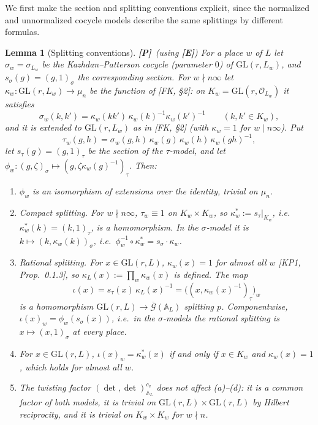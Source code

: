 \documentclass[12pt]{article}
\newcommand{\ov}[1]{\overline{#1}}
\newcommand{\A}{\mathbb{A}}
\newcommand{\cO}{\mathcal{O}}
\newcommand{\GL}{\mathrm{GL}}
\newcommand{\ks}{\kappa^{*}}
\newcommand{\cGb}{\ov{\mathcal{G}}}
\newcommand{\Pv}{\textbf{[P]}}
\newcommand{\Ev}{\textbf{[E]}}
\theoremstyle{plain}
\newtheorem{lemma}[theorem]{Lemma}
\theoremstyle{definition}
\begin{document}
We first make the section and splitting conventions explicit, since the normalized and unnormalized cocycle models describe the same splittings by different formulas.

\begin{lemma}[Splitting conventions]\label{lem:splittings}\Pv\ (using \Ev)
For a place $w$ of $L$ let $\sigma_w=\sigma_{L_w}$ be the Kazhdan--Patterson cocycle (parameter $0$) of $\GL(r,L_w)$, and $s_\sigma(g)=(g,1)_\sigma$ the corresponding section. For $w\nmid n\infty$ let $\kappa_w:\GL(r,L_w)\to\mu_n$ be the function of [FK, \S2]: on $K_w=\GL(r,\cO_{L_w})$ it satisfies
\begin{equation}\label{eq:kappaK}
\sigma_w(k,k')=\kappa_w(kk')\,\kappa_w(k)^{-1}\kappa_w(k')^{-1}\qquad(k,k'\in K_w),
\end{equation}
and it is extended to $\GL(r,L_w)$ as in [FK, \S2] (with $\kappa_w=1$ for $w\mid n\infty$). Put
\begin{equation}\label{eq:tausigma}
\tau_w(g,h)=\sigma_w(g,h)\,\kappa_w(g)\,\kappa_w(h)\,\kappa_w(gh)^{-1},
\end{equation}
let $s_\tau(g)=(g,1)_\tau$ be the section of the $\tau$-model, and let $\phi_w:(g,\zeta)_\sigma\mapsto(g,\zeta\kappa_w(g)^{-1})_\tau$. Then:
\begin{enumerate}[label=(\alph*)]
\item $\phi_w$ is an isomorphism of extensions over the identity, trivial on $\mu_n$.
\item \emph{Compact splitting.} For $w\nmid n\infty$, $\tau_w\equiv1$ on $K_w\times K_w$, so $\ks_w:=s_\tau|_{K_w}$, i.e.\ $\ks_w(k)=(k,1)_\tau$, is a homomorphism. In the $\sigma$-model it is $k\mapsto(k,\kappa_w(k))_\sigma$, i.e.\ $\phi_w^{-1}\circ\ks_w=s_\sigma\cdot\kappa_w$.
\item \emph{Rational splitting.} For $x\in\GL(r,L)$, $\kappa_w(x)=1$ for almost all $w$ [KP1, Prop.~0.1.3], so $\kappa_L(x):=\prod_w\kappa_w(x)$ is defined. The map
\[ \iota(x)=s_\tau(x)\,\kappa_L(x)^{-1}=\big((x,\kappa_w(x)^{-1})_\tau\big)_w \]
is a homomorphism $\GL(r,L)\to\cGb(\A_L)$ splitting $p$. Componentwise, $\iota(x)_w=\phi_w(s_\sigma(x))$, i.e.\ in the $\sigma$-models the rational splitting is $x\mapsto(x,1)_\sigma$ at every place.
\item For $x\in\GL(r,L)$, $\iota(x)_w=\ks_w(x)$ if and only if $x\in K_w$ and $\kappa_w(x)=1$, which holds for almost all $w$.
\item The twisting factor $(\det,\det)^{c_v}_{\A_L}$ does not affect (a)--(d): it is a common factor of both models, it is trivial on $\GL(r,L)\times\GL(r,L)$ by Hilbert reciprocity, and it is trivial on $K_w\times K_w$ for $w\nmid n$.
\end{enumerate}
\end{lemma}
\end{document}
